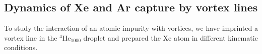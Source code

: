 

\subsection{Dynamics of  Xe and Ar capture by vortex lines}

To study the interaction of an atomic impurity with vortices, 
we have imprinted a vortex line in the $^4$He$_{1000}$ droplet 
and prepared the Xe atom in different kinematic conditions. 


